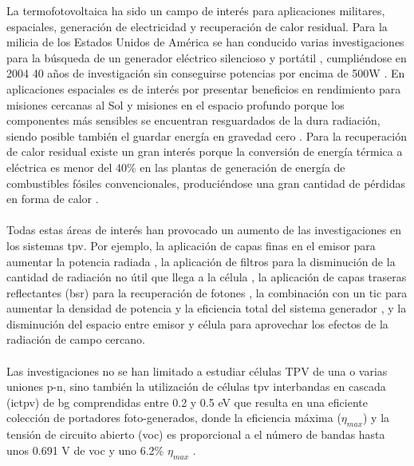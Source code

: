 La termofotovoltaica ha sido un campo de interés para aplicaciones militares, espaciales, generación de electricidad y recuperación de calor residual. Para la milicia de los Estados Unidos de América se han conducido varias investigaciones para la búsqueda de un generador eléctrico silencioso y portátil \cite{military_TPV}, cumpliéndose en 2004 40 años de investigación sin conseguirse potencias por encima de 500W \cite{military_TPV_40Years}. En aplicaciones espaciales es de interés por presentar beneficios en rendimiento para misiones cercanas al Sol y misiones en el espacio profundo porque los componentes más sensibles se encuentran resguardados de la dura radiación, siendo posible también el guardar energía en gravedad cero \cite{TPV_space_applications}. Para la recuperación de calor residual existe un gran interés porque la conversión de energía térmica a eléctrica es menor del 40\% en las plantas de generación de energía de combustibles fósiles convencionales, produciéndose una gran cantidad de pérdidas en forma de calor \cite{wasteHeat_TPV}.\\\\
Todas estas áreas de interés han provocado un aumento de las investigaciones en los sistemas \acrshort{tpv}. Por ejemplo, la aplicación de capas finas en el emisor para aumentar la potencia radiada \cite{doi:Near_field_ThinFilm}, la aplicación de filtros  para la disminución de la cantidad de radiación no útil que llega a la célula \cite{multiLayerFilters}, la aplicación de capas traseras reflectantes (\acrshort{bsr}) para la recuperación de fotones \cite{thermoionic_TPV_NF}, la combinación con un \acrshort{tic} para aumentar la densidad de potencia y la eficiencia total del sistema generador \cite{thermoionic_TPV_NF,progress_Thermoionic_TPV}, y la disminución del espacio entre emisor y célula para aprovechar los efectos de la radiación de campo cercano\cite{thermoionic_TPV_NF,modelEfficiency_NF_TPV,nf_TPV_Pillars_SiO2}.\\\\
Las investigaciones no se han limitado a estudiar células TPV de una o varias uniones p-n, sino también la utilización de células \acrshort{tpv} interbandas en cascada (\acrshort{ictpv}) de \acrshort{bg} comprendidas entre 0.2 y 0.5 eV que resulta en una eficiente colección de portadores foto-generados, donde la eficiencia máxima ($\eta_{max}$) y la tensión de circuito abierto (\acrshort{voc}) es proporcional a el número de bandas hasta unos 0.691 V de \acrshort{voc} y uno 6.2\% $\eta_{max}$ \cite{MultiEstados_Capas_TPVs}.\\\\
